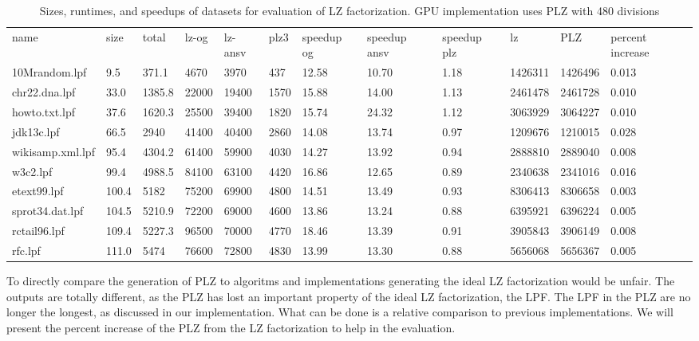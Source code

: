 \begin{table}[h]
\centering
\begin{tabular}{llllllllllll}
name             & size  & total  & lz-og & lz-ansv & plz3 & speedup og & speedup ansv & speedup plz & lz      & PLZ     & percent increase \\
10Mrandom.lpf    & 9.5   & 371.1  & 4670  & 3970    & 437  & 12.58      & 10.70        & 1.18        & 1426311 & 1426496 & 0.013         \\
chr22.dna.lpf    & 33.0  & 1385.8 & 22000 & 19400   & 1570 & 15.88      & 14.00        & 1.13        & 2461478 & 2461728 & 0.010         \\
howto.txt.lpf    & 37.6  & 1620.3 & 25500 & 39400   & 1820 & 15.74      & 24.32        & 1.12        & 3063929 & 3064227 & 0.010         \\
jdk13c.lpf       & 66.5  & 2940   & 41400 & 40400   & 2860 & 14.08      & 13.74        & 0.97        & 1209676 & 1210015 & 0.028         \\
wikisamp.xml.lpf & 95.4  & 4304.2 & 61400 & 59900   & 4030 & 14.27      & 13.92        & 0.94        & 2888810 & 2889040 & 0.008         \\
w3c2.lpf         & 99.4  & 4988.5 & 84100 & 63100   & 4420 & 16.86      & 12.65        & 0.89        & 2340638 & 2341016 & 0.016         \\
etext99.lpf      & 100.4 & 5182   & 75200 & 69900   & 4800 & 14.51      & 13.49        & 0.93        & 8306413 & 8306658 & 0.003         \\
sprot34.dat.lpf  & 104.5 & 5210.9 & 72200 & 69000   & 4600 & 13.86      & 13.24        & 0.88        & 6395921 & 6396224 & 0.005         \\
rctail96.lpf     & 109.4 & 5227.3 & 96500 & 70000   & 4770 & 18.46      & 13.39        & 0.91        & 3905843 & 3906149 & 0.008         \\
rfc.lpf          & 111.0 & 5474   & 76600 & 72800   & 4830 & 13.99      & 13.30        & 0.88        & 5656068 & 5656367 & 0.005        
\end{tabular}
\caption{Sizes, runtimes, and speedups of datasets for evaluation of LZ factorization. GPU implementation uses PLZ with 480 divisions}
\label{tab:lzdata}
\end{table}

To directly compare the generation of PLZ to algoritms and implementations generating the ideal LZ factorization would be unfair.
The outputs are totally different, as the PLZ has lost an important property of the ideal LZ factorization, the LPF.
The LPF in the PLZ are no longer the longest, as discussed in our implementation.
What can be done is a relative comparison to previous implementations.
We will present the percent increase of the PLZ from the LZ factorization to help in the evaluation.

